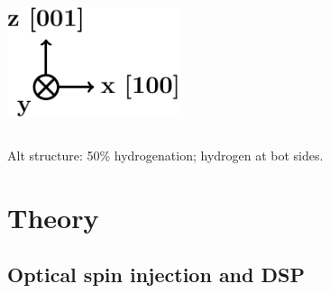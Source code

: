 \documentclass{beamer}
\begin{document}
\begin{frame}
\begin{columns}
\vspace{5mm}

\flushleft
\includegraphics[width=0.9\textwidth]{figs/arrows2.pdf}

\end{columns}

\vspace{-4mm}
\begin{center}
{\Large Alt structure:} 50\% hydrogenation; hydrogen at bot sides.
\end{center}

\end{frame}




\section{Theory} 



\subsection{Optical spin injection and DSP}
\end{document}
